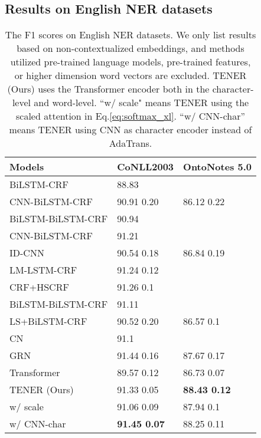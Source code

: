 \documentclass[11pt,a4paper]{article}
\begin{document}
\subsection{Results on English NER datasets}



\begin{table}[t]\small \setlength{\tabcolsep}{3pt}
  \centering
\begin{threeparttable}
  \begin{tabular}{p{12em}ll}
  \toprule
  Models                        & CoNLL2003        & OntoNotes 5.0    \\ \midrule
  BiLSTM-CRF \citep{huang2015bidirectional} & 88.83            &                  \\
  CNN-BiLSTM-CRF \citep{DBLP:journals/tacl/ChiuN16}          & 90.91  0.20 & 86.12  0.22 \\
  BiLSTM-BiLSTM-CRF \citep{lample2016neural}       & 90.94            &                  \\
  CNN-BiLSTM-CRF \citep{ma2016end}             & 91.21            &                  \\
  ID-CNN \citep{strubell2017fast}       & 90.54  0.18 & 86.84  0.19 \\
  LM-LSTM-CRF \citep{DBLP:conf/aaai/LiuSRXG0018}         & 91.24  0.12 &                  \\
  CRF+HSCRF \citep{ye2018hybrid}           & 91.26  0.1  &                  \\
  BiLSTM-BiLSTM-CRF \citep{adnan2018}              & 91.11            &             \\
  LS+BiLSTM-CRF \citep{ghaddar2018robust}      & 90.52  0.20 & 86.57  0.1  \\
  CN \citep{liu2019contextualized}  & 91.1             &                  \\
  GRN \citep{chen2019grn}           & 91.44  0.16 & 87.67  0.17 \\
  Transformer                   & 89.57  0.12 &    86.73  0.07  \\
  TENER (Ours)               & 91.33  0.05 & \textbf{88.43  0.12} \\
  \quad w/ scale                        & 91.06  0.09     & 87.94  0.1 \\
  \quad w/ CNN-char              & \textbf{91.45  0.07} & 88.25  0.11 \\
  \bottomrule
  \end{tabular}
  \end{threeparttable}
  \caption{The F1 scores on English NER datasets. We only list results based on non-contextualized embeddings, and methods utilized pre-trained language models, pre-trained features, or higher dimension word vectors are excluded. TENER (Ours) uses the Transformer encoder both in the character-level and word-level. ``w/ scale" means TENER using the scaled attention in Eq.\eqref{eq:softmax_xl}.  ``w/ CNN-char'' means TENER using CNN as character encoder instead of AdaTrans.
  } \label{tab:en_ner}
\end{table}
\end{document}
